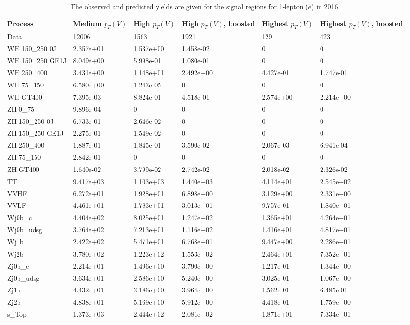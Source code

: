 \begin{table}
\centering
\caption[2016 1-lepton ($e$) signal selection yields]{
                  The observed and predicted yields are given for the
                  signal regions for 1-lepton ($e$) in 2016.
                  }
{\footnotesize
\begin{tabularx}{\textwidth}{|X|X|X|X|X|X|}
\hline
Process & Medium $p_{T}(V)$ & High $p_{T}(V)$ & High $p_{T}(V)$, boosted & Highest $p_{T}(V)$ & Highest $p_{T}(V)$, boosted \\
\hline
Data & 12006 & 1563 & 1921 & 129 & 423 \\
\hline
WH 150\_250 0J & 2.357e+01 & 1.537e+00 & 1.458e-02 & 0 & 0 \\
WH 150\_250 GE1J & 8.049e+00 & 5.998e-01 & 1.080e-01 & 0 & 0 \\
WH 250\_400 & 3.431e+00 & 1.148e+01 & 2.492e+00 & 4.427e-01 & 1.747e-01 \\
WH 75\_150 & 6.580e+00 & 1.243e-05 & 0 & 0 & 0 \\
WH GT400 & 7.395e-03 & 8.824e-01 & 4.518e-01 & 2.574e+00 & 2.214e+00 \\
ZH 0\_75 & 9.896e-04 & 0 & 0 & 0 & 0 \\
ZH 150\_250 0J & 6.733e-01 & 2.646e-02 & 0 & 0 & 0 \\
ZH 150\_250 GE1J & 2.275e-01 & 1.549e-02 & 0 & 0 & 0 \\
ZH 250\_400 & 1.887e-01 & 1.845e-01 & 3.590e-02 & 2.067e-03 & 6.941e-04 \\
ZH 75\_150 & 2.842e-01 & 0 & 0 & 0 & 0 \\
ZH GT400 & 1.640e-02 & 3.799e-02 & 2.742e-02 & 2.018e-02 & 2.326e-02 \\
\hline
TT & 9.417e+03 & 1.103e+03 & 1.440e+03 & 4.114e+01 & 2.545e+02 \\
VVHF & 6.272e+01 & 1.928e+01 & 6.898e+00 & 3.129e+00 & 2.331e+00 \\
VVLF & 4.461e+01 & 1.783e+01 & 3.013e+01 & 9.757e-01 & 1.840e+01 \\
Wj0b\_c & 4.404e+02 & 8.025e+01 & 1.247e+02 & 1.365e+01 & 4.264e+01 \\
Wj0b\_udsg & 3.764e+02 & 7.213e+01 & 1.116e+02 & 1.416e+01 & 4.817e+01 \\
Wj1b & 2.422e+02 & 5.471e+01 & 6.768e+01 & 9.447e+00 & 2.286e+01 \\
Wj2b & 3.780e+02 & 1.223e+02 & 1.553e+02 & 2.464e+01 & 7.352e+01 \\
Zj0b\_c & 2.214e+01 & 1.496e+00 & 3.790e+00 & 1.217e-01 & 1.344e+00 \\
Zj0b\_udsg & 3.634e+01 & 2.586e+00 & 5.240e+00 & 3.025e-01 & 1.067e+00 \\
Zj1b & 4.432e+01 & 3.186e+00 & 3.964e+00 & 1.562e-01 & 6.485e-01 \\
Zj2b & 4.838e+01 & 5.169e+00 & 5.912e+00 & 4.418e-01 & 1.759e+00 \\
s\_Top & 1.373e+03 & 2.444e+02 & 2.081e+02 & 1.871e+01 & 7.334e+01 \\
\hline
\end{tabularx}
}
\label{tab:sr-Wen-2016}
\end{table}

